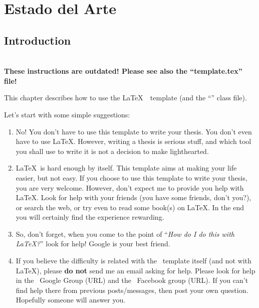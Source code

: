 \chapter{Estado del Arte}
\label{cha:users_manual}

\section{Introduction} %
\label{sec:introduction}

{\LARGE \textbf{~\\These instructions are outdated! Please see also the “template.tex” file!\\}}

This chapter describes how to use the \LaTeX\ \novathesis\ template (and the “\novathesisclass” class file).

Let's start with some simple suggestions:

\begin{enumerate}
  \item No! You don't have to use this template to write your thesis.  You don't even have to use \LaTeX.  However, writing a thesis is serious stuff, and which tool you shall use to write it is not a decision to make lighthearted.
  \item \LaTeX\ is hard enough by itself.  This template aims at making your life easier, but not easy. If you choose to use this template to write your thesis, you are very welcome.  However, don't expect me to provide you help with \LaTeX.  Look for help with your friends (you have some friends, don't you?), or search the web, or try even to read some book(s) on \LaTeX. In the end you will certainly find the experience rewarding.
  \item So, don't forget, when you come to the point of “\emph{How do I do this with \LaTeX?}” look for help!  Google is your best friend. 
  \item If you believe the difficulty is related with the \novathesis\ template itself (and not with \LaTeX), please \textbf{do not} send me an email asking for help.  Please look for help in the \novathesis\ Google Group (URL) and the \novathesis\ Facebook group (URL).  If you can't find help there from previous posts/messages, then post your own question. Hopefully someone will answer you.
\end{enumerate}

